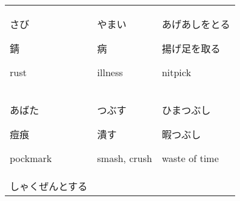 \documentclass[12pt, a4j, landscape, dvipdfmx]{utarticle}
\begin{document}
\begin{minipage}[t][0pt]{\linewidth }
\begin{tabular}{||p{5.5cm}||p{5.5cm}||p{5.5cm}||}
{            さび}\newline \rule{0pt}{3ex} \hspace*{.4cm}
            {\small 錆}\newline \rule{0pt}{3ex}
            \hspace*{.425cm} {\small rust}&\rule{0pt}{3ex}
            \hspace*{-.4cm} {\LARGE やまい}\newline
            \rule{0pt}{3ex} \hspace*{.4cm} {\small
            病}\newline \rule{0pt}{3ex} \hspace*{.425cm}
            {\small illness}&\rule{0pt}{3ex} \hspace*{-.4cm}
            {\LARGE あげあしをとる}\newline \rule{0pt}{3ex}
            \hspace*{.4cm} {\small 揚げ足を取る}\newline
            \rule{0pt}{3ex} \hspace*{.425cm} {\small
            nitpick}\tabularnewline \hhline{|:=::=::=:|}
            \rule{0pt}{3ex} \hspace*{-.4cm} {\LARGE
            あばた}\newline \rule{0pt}{3ex} \hspace*{.4cm}
            {\small 痘痕}\newline \rule{0pt}{3ex}
            \hspace*{.425cm} {\small
            pockmark}&\rule{0pt}{3ex} \hspace*{-.4cm}
            {\LARGE つぶす}\newline \rule{0pt}{3ex}
            \hspace*{.4cm} {\small 潰す}\newline
            \rule{0pt}{3ex} \hspace*{.425cm} {\small
            smash, crush}&\rule{0pt}{3ex} \hspace*{-.4cm}
            {\LARGE ひまつぶし}\newline \rule{0pt}{3ex}
            \hspace*{.4cm} {\small 暇つぶし}\newline
            \rule{0pt}{3ex} \hspace*{.425cm} {\small
            waste of time}\tabularnewline
            \hhline{|:=::=::=:|} \rule{0pt}{3ex}
            \hspace*{-.4cm} {\LARGE しゃくぜんとする}\newline

\end{tabular}
\end{minipage}
\end{document}
